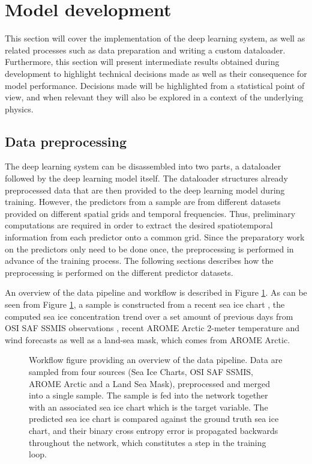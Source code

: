 \documentclass[../main/thesis]{subfiles}
\begin{document}
\section{Model development}
\label{sec:developing a unet}
This section will cover the implementation of the deep learning system, as well as related processes such as data preparation and writing a custom dataloader. Furthermore, this section will present intermediate results obtained during development to highlight technical decisions made as well as their consequence for model performance. Decisions made will be highlighted from a statistical point of view, and when relevant they will also be explored in a context of the underlying physics.

\subsection{Data preprocessing}
The deep learning system can be disassembled into two parts, a dataloader followed by the deep learning model itself. The dataloader structures already preprocessed data that are then provided to the deep learning model during training. However, the predictors from a sample are from different datasets provided on different spatial grids and temporal frequencies. Thus, preliminary computations are required in order to extract the desired spatiotemporal information from each predictor onto a common grid. Since the preparatory work on the predictors only need to be done once, the preprocessing is performed in advance of the training process. The following sections describes how the preprocessing is performed on the different predictor datasets.

An overview of the data pipeline and workflow is described in Figure \ref{fig:data_pipeline}. As can be seen from Figure \ref{fig:data_pipeline}, a sample is constructed from a recent sea ice chart \citep{Dinessen2020}, the computed sea ice concentration trend over a set amount of previous days from OSI SAF SSMIS observations \citep{Tonboe2017}, recent AROME Arctic \citep{Mueller2017} 2-meter temperature and wind forecasts as well as a land-sea mask, which comes from AROME Arctic. 

\begin{figure}
    \centering
    
    \caption{\label{fig:data_pipeline} Workflow figure providing an overview of the data pipeline. Data are sampled from four sources (Sea Ice Charts, OSI SAF SSMIS, AROME Arctic and a Land Sea Mask), preprocessed and merged into a single sample. The sample is fed into the network together with an associated sea ice chart which is the target variable. The predicted sea ice chart is compared against the ground truth sea ice chart, and their binary cross entropy error is propagated backwards throughout the network, which constitutes a step in the training loop.}
\end{figure}
\end{document}
